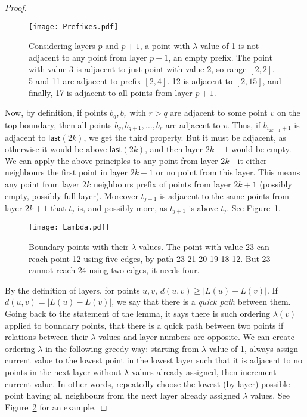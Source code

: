 \documentclass[a4paper,11pt]{article}
\newcommand{\lam}{\lambda}
\newcommand{\last}{\mathsf{last}}
\begin{document}
\begin{proof}
\begin{figure}[h]
\begin{center}
  \texttt{[image: Prefixes.pdf]}
\end{center}
\caption{Considering layers $p$ and $p+1$, a point with $\lam$ value of 1 is not adjacent to any point from layer $p+1$,
an empty prefix.
The point with value 3 is adjacent to just point with value 2, so range $[2,2]$.
5 and 11 are adjacent to prefix $[2,4]$.
12 is adjacent to $[2,15]$, and finally, 17 is adjacent to all points from layer $p+1$.}
\label{Fig:Prefixes}
\end{figure}

Now, by definition, if points $b_q, b_r$ with $r>q$ are adjacent to some point $v$ on the top boundary,
then all points $b_q, b_{q+1}, \ldots, b_r$ are adjacent to $v$.
Thus, if $b_{i_{2k-1}+1}$ is adjacent to $\last(2k)$, we get the third property.
But it must be adjacent, as otherwise it would be above $\last(2k)$, and then layer $2k+1$ would be empty.
We can apply the above principles to any point from layer $2k$ - it either neighbours the first point in layer $2k+1$ or no point from this layer.
This means any point from layer $2k$ neighbours prefix of points from layer $2k+1$ (possibly empty, possibly full layer).
Moreover $t_{j+1}$ is adjacent to the same points from layer $2k+1$ that $t_j$ is, and possibly more, as $t_{j+1}$ is above $t_j$.
See Figure~\ref{Fig:Prefixes}.

\begin{figure}[h]
\begin{center}
  \texttt{[image: Lambda.pdf]}
\end{center}
\caption{Boundary points with their $\lam$ values. The point with value 23 can reach point 12 using five edges,
by path 23-21-20-19-18-12.
But 23 cannot reach 24 using two edges, it needs four.}
\label{Fig:Lambda}
\end{figure}

By the definition of layers, for points $u,v$, $d(u,v) \geq |L(u)-L(v)|$.
If $d(u,v)=|L(u)-L(v)|$, we say that there is a \emph{quick path} between them.
Going back to the statement of the lemma, it says there is such ordering $\lam(v)$ applied to boundary points,
that there is a quick path between two points if relations between their $\lam$ values and layer numbers are opposite.
We can create ordering $\lam$ in the following greedy way: starting from $\lam$ value of 1,
always assign current value to the lowest point in the lowest layer such that it is adjacent to no points in the next layer
without $\lam$ values already assigned, then increment current value.
In other words, repeatedly choose the lowest (by layer) possible point
having all neighbours from the next layer already assigned $\lam$ values.
See Figure~\ref{Fig:Lambda} for an example.


\end{proof}
\end{document}
